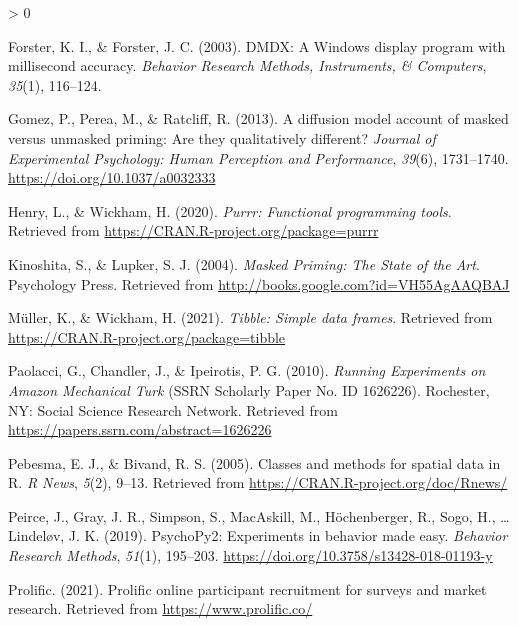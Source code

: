 \documentclass[
  english,
  man]{apa6}
\newlength{\cslhangindent}
\newenvironment{CSLReferences}[2] %
 {%
  \setlength{\parindent}{0pt}
  \ifodd #1 \everypar{\setlength{\hangindent}{\cslhangindent}}\ignorespaces\fi
  \ifnum #2 > 0
  \setlength{\parskip}{#2\baselineskip}
  \fi
 }%
 {}
\begin{document}
\begin{CSLReferences}{1}{0}
\leavevmode\hypertarget{ref-forsterDMDXWindowsDisplay2003}{}%
Forster, K. I., \& Forster, J. C. (2003). {DMDX}: {A Windows} display program with millisecond accuracy. \emph{Behavior Research Methods, Instruments, \& Computers}, \emph{35}(1), 116--124.

\leavevmode\hypertarget{ref-gomezDiffusionModelAccount2013}{}%
Gomez, P., Perea, M., \& Ratcliff, R. (2013). A diffusion model account of masked versus unmasked priming: {Are} they qualitatively different? \emph{Journal of Experimental Psychology: Human Perception and Performance}, \emph{39}(6), 1731--1740. \url{https://doi.org/10.1037/a0032333}

\leavevmode\hypertarget{ref-R-purrr}{}%
Henry, L., \& Wickham, H. (2020). \emph{Purrr: Functional programming tools}. Retrieved from \url{https://CRAN.R-project.org/package=purrr}

\leavevmode\hypertarget{ref-kinoshitaMaskedPrimingState2004}{}%
Kinoshita, S., \& Lupker, S. J. (2004). \emph{Masked {Priming}: {The State} of the {Art}}. {Psychology Press}. Retrieved from \url{http://books.google.com?id=VH55AgAAQBAJ}

\leavevmode\hypertarget{ref-R-tibble}{}%
Müller, K., \& Wickham, H. (2021). \emph{Tibble: Simple data frames}. Retrieved from \url{https://CRAN.R-project.org/package=tibble}

\leavevmode\hypertarget{ref-paolacciRunningExperimentsAmazon2010}{}%
Paolacci, G., Chandler, J., \& Ipeirotis, P. G. (2010). \emph{Running {Experiments} on {Amazon Mechanical Turk}} (SSRN Scholarly Paper No. ID 1626226). {Rochester, NY}: {Social Science Research Network}. Retrieved from \url{https://papers.ssrn.com/abstract=1626226}

\leavevmode\hypertarget{ref-R-sp}{}%
Pebesma, E. J., \& Bivand, R. S. (2005). Classes and methods for spatial data in {R}. \emph{R News}, \emph{5}(2), 9--13. Retrieved from \url{https://CRAN.R-project.org/doc/Rnews/}

\leavevmode\hypertarget{ref-peirce2019}{}%
Peirce, J., Gray, J. R., Simpson, S., MacAskill, M., Höchenberger, R., Sogo, H., \ldots{} Lindeløv, J. K. (2019). PsychoPy2: Experiments in behavior made easy. \emph{Behavior Research Methods}, \emph{51}(1), 195--203. \url{https://doi.org/10.3758/s13428-018-01193-y}

\leavevmode\hypertarget{ref-prolific2021}{}%
Prolific. (2021). Prolific \textbar{} online participant recruitment for surveys and market research. Retrieved from \url{https://www.prolific.co/}


\end{CSLReferences}
\end{document}
